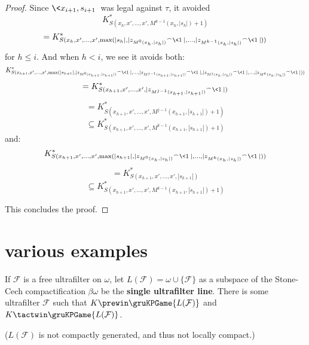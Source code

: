 \begin{proof}
Since $\<x_{i+1},s_{i+1}\>$ was legal against $\tau$, it avoided
  \[
    K^*_{S(x_h,x',\dots,x',M^{k-1}(x_h,|s_h|)+1)}
  \]
  \[
    =
    K^*_{S(x_h,x',\dots,x',\max(|s_h|,|{z_{M^{0}(x_h,|s_h|)}}^\frown\<1\>|,\dots,|{z_{M^{k-1}(x_h,|s_h|)}}^\frown\<1\>|))}
  \]
for $h\leq i$. And when $h<i$, we see it avoids both:
  \[
    K^*_{S(x_{h+1},x',\dots,x',\max(|s_{h+1}|,|{z_{M^0(x_{h+1},|s_{h+1}|)}}^\frown\<1\>|,\dots,|{z_{M^{j-1}(x_{h+1},|s_{h+1}|)}}^\frown\<1\>|,|{z_{M^{j}(x_{h},|s_{h}|)}}^\frown\<1\>|,\dots,|{z_{M^{k}(x_{h},|s_{h}|)}}^\frown\<1\>|))}
  \]
  \[
    =
    K^*_{S(x_{h+1},x',\dots,x',|{z_{M^{j-1}(x_{h+1},|s_{h+1}|)}}^\frown\<1\>|)}
  \]
  \[
    =
    K^*_{S(x_{h+1},x',\dots,x',M^{j-1}(x_{h+1},|s_{h+1}|)+1)}
  \]
  \[
    \subseteq
    K^*_{S(x_{h+1},x',\dots,x',M^{k-1}(x_{h+1},|s_{h+1}|)+1)}
  \]
and:
  \[
    K^*_{S(x_{h+1},x',\dots,x',\max(|s_{h+1}|,|{z_{M^0(x_{h},|s_{h}|)}}^\frown\<1\>|,\dots,|{z_{M^{k}(x_{h},|s_{h}|)}}^\frown\<1\>|))}
  \]
  \[
    =
    K^*_{S(x_{h+1},x',\dots,x',|s_{k+1}|)}
  \]
  \[
    \subseteq
    K^*_{S(x_{h+1},x',\dots,x',M^{k-1}(x_{h+1},|s_{h+1}|)+1)}
  \]


This concludes the proof.
\end{proof}




\section{various examples}

\begin{ex}
If $\mathcal{F}$ is a free ultrafilter on $\omega$, let $L(\mathcal{F})=\omega \cup \{\mathcal{F}\}$ as a subspace of the Stone-Cech compactification $\beta\omega$ be the \textbf{single ultrafilter line}. There is some ultrafilter $\mathcal{F}$ such that $K \prewin \gruKPGame{L(\mathcal{F})}$ and $K \tactwin \gruKPGame{L(\mathcal{F})}$.

($L(\mathcal{F})$ is not compactly generated, and thus not locally compact.)
\end{ex}

